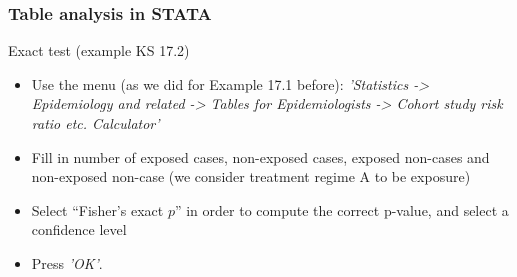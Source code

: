 \documentclass[compress, notes=hide]{beamer}
\begin{document}




\begin{frame}
	\frametitle{Table analysis in STATA}
	
	\begin{block}{Exact test (example KS 17.2)}
		\begin{itemize}
		\item Use the menu (as we did for Example 17.1 before): \emph{'Statistics -> Epidemiology and related -> Tables for Epidemiologists -> Cohort study risk  ratio etc. Calculator'}
		\item Fill in  number of exposed cases, non-exposed cases, exposed non-cases and non-exposed non-case (we consider treatment regime A to be exposure)
		\item Select ``Fisher's exact $p$'' in order to compute the correct p-value, and select a confidence level
		\item Press \emph{'OK'}.
	\end{itemize}
	\end{block}

\end{frame}
\end{document}
